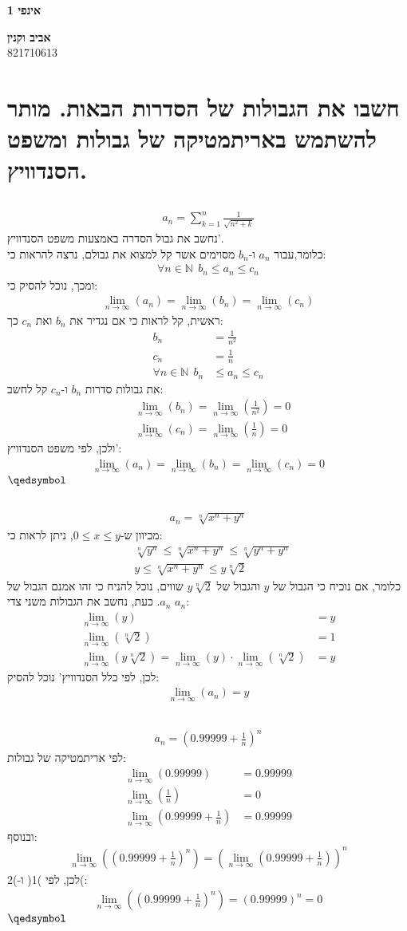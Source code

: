 \documentclass[a4paper, 12pt, leqno]{article}
\newcommand{\sub}[1]{\subsection{\underline{#1}}}
\newcommand{\N}{\ensuremath{\mathbb{N}}}
\newcommand{\eq}[1]{\begin{align*}#1\end{align*}}
\newcommand{\eqn}[1]{\begin{align}#1\end{align}}
\renewcommand{\qed}{\hfill\(\qedsymbol\)}
\renewcommand{\leq}{\leqslant}
\newcommand{\limn}{\lim_{n\to\infty}}
\begin{document}
\begin{titlepage}
    \begin{center}
        \vspace*{4cm}
    
        {\fontsize{35pt}{35pt}\selectfont \textbf{אינפי 1}}
        
        \vspace{0.4cm}
        
        {}
    
        \vfill
            
        {\Large\textbf{אביב וקנין}\\821710613}
    \end{center}
\end{titlepage}

\section{חשבו את הגבולות של הסדרות הבאות. מותר להשתמש באריתמטיקה של גבולות ומשפט הסנדוויץ.}
\setcounter{subsection}{1}
\sub{}

\eq{
    a_n=\sum^{n}_{k=1}\frac{1}{\sqrt{n^2+k}}
}
נחשב את גבול הסדרה באמצעות משפט הסנדוויץ'.\\
כלומר,עבור $a_n$ ו-$b_n$ מסוימים אשר קל למצוא את גבולם, נרצה להראות כי:
\eq{
    \forall{n}\in\N~~b_n\leq{a_n}\leq{c_n}
}
ומכך, נוכל להסיק כי:
\eq{
    \limn(a_n)=\limn(b_n)=\limn(c_n)
}
ראשית, קל לראות כי אם נגדיר את $b_n$ ואת $c_n$ כך:
\eq{
    b_n&=\frac{1}{n^2}\\
    c_n&=\frac{1}{n}\\
    \forall{n}\in\N~~b_n&\leq{a_n}\leq{c_n}
}
את גבולות סדרות $b_n$ ו-$c_n$ קל לחשב:
\eq{
    &\limn(b_n)=\limn(\frac{1}{n^2})=0\\
    &\limn(c_n)=\limn(\frac{1}{n})=0
}
ולכן, לפי משפט הסנדוויץ':
\eq{
    \limn(a_n)=\limn(b_n)=\limn(c_n)=0
}
\qed\pagebreak
\setcounter{subsection}{3}
\sub{}
\eq{
    a_n=\sqrt[n]{x^n+y^n}
}
מכיוון ש-$0\leq{x}\leq{y}$, ניתן לראות כי:
\eq{
    &\sqrt[n]{y^n}\leq\sqrt[n]{x^n+y^n}\leq \sqrt[n]{y^n+y^n}\\
    &y\leq\sqrt[n]{x^n+y^n}\leq{y}\sqrt[n]{2}
}
כלומר, אם נוכיח כי הגבול של $y$ והגבול של ${y}\sqrt[n]{2}$ שווים, נוכל להניח כי זהו אמנם הגבול של $a_n$.
כעת, נחשב את הגבולות משני צדי $a_n$:
\eq{
    \limn(y)&=y\\
    \limn(\sqrt[n]{2})&=1\\
    \limn(y\sqrt[n]{2})
    =\limn(y)\cdot\limn(\sqrt[n]{2})
    &=y
}
לכן, לפי כלל הסנדוויץ' נוכל להסיק:
\eq{
    \limn(a_n)=y
}
\setcounter{subsection}{4}
\sub{}
\eq{
    a_n=(0.99999+\frac{1}{n})^n
}
לפי אריתמטיקה של גבולות:
\eqn{
    \limn(0.99999)&=0.99999\nonumber\\
    \limn(\frac{1}{n})&=0\nonumber\\
    \limn(0.99999+\frac{1}{n})&=0.99999
}
ובנוסף:
\eqn{
    \limn((0.99999+\frac{1}{n})^n)=(\limn(0.99999+\frac{1}{n}))^n
}
לכן, לפי )1( ו-)2(:
\eq{
    \limn((0.99999+\frac{1}{n})^n)=(0.99999)^n=0
}
\qed\pagebreak
\end{document}
